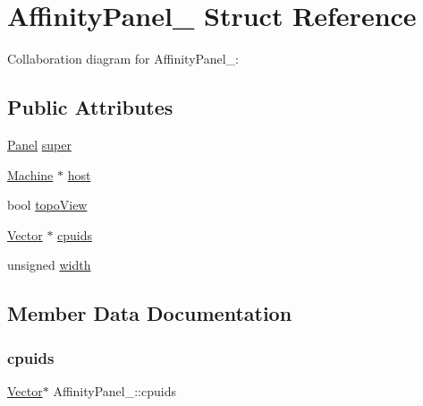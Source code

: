 \hypertarget{structAffinityPanel__}{}\section{Affinity\+Panel\+\_\+ Struct Reference}
\label{structAffinityPanel__}


Collaboration diagram for Affinity\+Panel\+\_\+\+:
\subsection*{Public Attributes}
\begin{DoxyCompactItemize}
\item 
\hyperlink{Panel_8h_a034d4c16521db412dc7a1e8536d16fae}{Panel} \hyperlink{structAffinityPanel___a00cd78bcdde51b85f2c19aee0a0fa181}{super}
\item 
\hyperlink{Machine_8h_aa3706f95e4706b9d02979efcabb1341d}{Machine} $\ast$ \hyperlink{structAffinityPanel___a3579e3b72de57b268d26d0066e10965b}{host}
\item 
bool \hyperlink{structAffinityPanel___a720a60029febdaff582eb0808416d375}{topo\+View}
\item 
\hyperlink{Vector_8h_a8297b82ce917cd21838596b7e3a7faa8}{Vector} $\ast$ \hyperlink{structAffinityPanel___ab86857fdf4e4617a8991b8bc9f13e98a}{cpuids}
\item 
unsigned \hyperlink{structAffinityPanel___ac3223519e695c7a458eebb870541edc7}{width}
\end{DoxyCompactItemize}


\subsection{Member Data Documentation}
\mbox{\label{structAffinityPanel___ab86857fdf4e4617a8991b8bc9f13e98a}} 
\subsubsection{\texorpdfstring{cpuids}{cpuids}}
{\footnotesize\ttfamily \hyperlink{Vector_8h_a8297b82ce917cd21838596b7e3a7faa8}{Vector}$\ast$ Affinity\+Panel\+\_\+\+::cpuids}

\mbox{\label{structAffinityPanel___a3579e3b72de57b268d26d0066e10965b}} 
